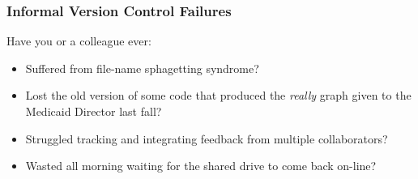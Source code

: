 \documentclass{beamer}
\begin{document}
\begin{frame}  %
  \frametitle{Informal Version Control Failures}
  {\large Have you or a colleague ever:}
  \bigskip
  \begin{itemize}
  \item Suffered from file-name sphagetting syndrome?
  \item Lost the old version of some code that produced the \emph{really} graph given
    to the Medicaid Director last fall?
  \item Struggled tracking and integrating feedback from multiple
    collaborators?
  \item Wasted all morning waiting for the shared drive to come back on-line?
  \end{itemize}
\end{frame}
\end{document}
